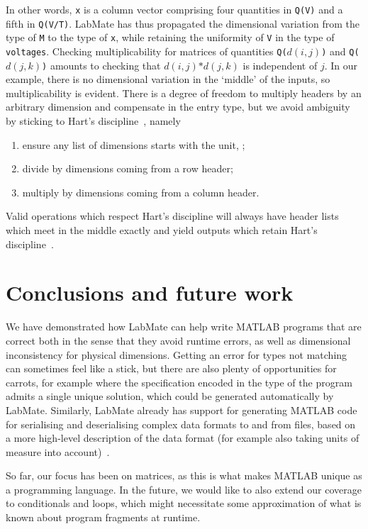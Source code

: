 \documentclass{IMEKO2024}
\newcommand{\lcb}{\texttt{\symbol{123}}}
\newcommand{\rcb}{\texttt{\symbol{125}}}
\begin{document}
In other words, \texttt{x} is a column vector comprising four quantities in \texttt{Q(V)} and a fifth in \texttt{Q(V/T)}.
LabMate has thus propagated the dimensional variation from the type of \texttt{M} to the type of \texttt{x}, while retaining the uniformity of \texttt{V} in the type of \texttt{voltages}. Checking multiplicability for matrices of quantities \texttt{Q(}$d(i,j)$\texttt{)} and
\texttt{Q(}$d(j,k)$\texttt{)} amounts to checking that $d(i,j)\texttt{*}d(j,k)$ is independent of $j$. In our example, there is no dimensional variation in the `middle' of the inputs, so multiplicability is evident. There is a degree of freedom to multiply headers by an arbitrary dimension and compensate in the entry type, but we avoid ambiguity by sticking to Hart's discipline~\cite{hart}, namely
\begin{enumerate}
\item ensure any list of dimensions starts with the unit, \lcb\rcb;
\item divide by dimensions coming from a row header;
\item multiply by dimensions coming from a column header.
\end{enumerate}
Valid operations which respect Hart's discipline will always have header lists which meet in the middle exactly and yield outputs which retain Hart's discipline~\cite{dimTypes}.

  
  
\section{Conclusions and future work}

We have demonstrated how LabMate can help write MATLAB programs that are correct both in the sense that they avoid runtime errors, as well as dimensional inconsistency for physical dimensions.
%
Getting an error for types not matching can sometimes feel like a stick, but there are also plenty of opportunities for carrots, for example where the specification encoded in the type of the program admits a single unique solution, which could be generated automatically by LabMate.
%
Similarly, LabMate already has support for generating MATLAB code for serialising and deserialising complex data formats to and from files, based on a more high-level description of the data format (for example also taking units of measure into account)~\cite{mgen}.

So far, our focus has been on matrices, as this is what makes MATLAB
unique as a programming language.
%
In the future, we would like to also extend our coverage to
conditionals and loops, which might necessitate some approximation of
what is known about program fragments at runtime.
\end{document}

